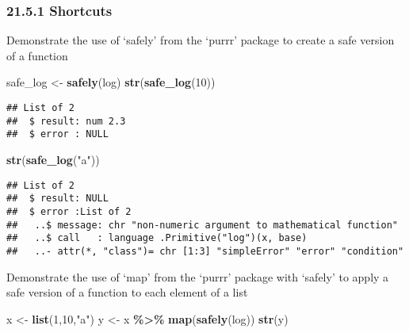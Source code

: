 \documentclass[
]{article}
\newenvironment{Shaded}{\begin{snugshade}}{\end{snugshade}}
\newcommand{\DecValTok}[1]{\textcolor[rgb]{0.00,0.00,0.81}{#1}}
\newcommand{\FunctionTok}[1]{\textcolor[rgb]{0.13,0.29,0.53}{\textbf{#1}}}
\newcommand{\NormalTok}[1]{#1}
\newcommand{\OtherTok}[1]{\textcolor[rgb]{0.56,0.35,0.01}{#1}}
\newcommand{\SpecialCharTok}[1]{\textcolor[rgb]{0.81,0.36,0.00}{\textbf{#1}}}
\newcommand{\StringTok}[1]{\textcolor[rgb]{0.31,0.60,0.02}{#1}}
\begin{document}
\hypertarget{shortcuts}{%
\subsubsection{21.5.1 Shortcuts}\label{shortcuts}}

Demonstrate the use of `safely' from the `purrr' package to create a
safe version of a function

\begin{Shaded}
\begin{Highlighting}[]
\NormalTok{safe\_log }\OtherTok{\textless{}{-}} \FunctionTok{safely}\NormalTok{(log)}
\FunctionTok{str}\NormalTok{(}\FunctionTok{safe\_log}\NormalTok{(}\DecValTok{10}\NormalTok{))}
\end{Highlighting}
\end{Shaded}

\begin{verbatim}
## List of 2
##  $ result: num 2.3
##  $ error : NULL
\end{verbatim}

\begin{Shaded}
\begin{Highlighting}[]
\FunctionTok{str}\NormalTok{(}\FunctionTok{safe\_log}\NormalTok{(}\StringTok{"a"}\NormalTok{))}
\end{Highlighting}
\end{Shaded}

\begin{verbatim}
## List of 2
##  $ result: NULL
##  $ error :List of 2
##   ..$ message: chr "non-numeric argument to mathematical function"
##   ..$ call   : language .Primitive("log")(x, base)
##   ..- attr(*, "class")= chr [1:3] "simpleError" "error" "condition"
\end{verbatim}

Demonstrate the use of `map' from the `purrr' package with `safely' to
apply a safe version of a function to each element of a list

\begin{Shaded}
\begin{Highlighting}[]
\NormalTok{x }\OtherTok{\textless{}{-}} \FunctionTok{list}\NormalTok{(}\DecValTok{1}\NormalTok{,}\DecValTok{10}\NormalTok{,}\StringTok{"a"}\NormalTok{)}
\NormalTok{y }\OtherTok{\textless{}{-}}\NormalTok{ x }\SpecialCharTok{\%\textgreater{}\%} \FunctionTok{map}\NormalTok{(}\FunctionTok{safely}\NormalTok{(log))}
\FunctionTok{str}\NormalTok{(y)}
\end{Highlighting}
\end{Shaded}
\end{document}
